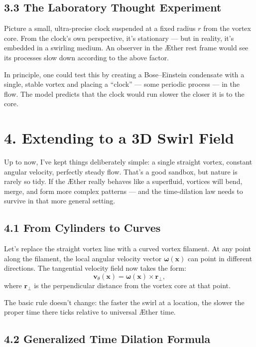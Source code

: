 \documentclass[11pt]{article}
\begin{document}
\subsection*{3.3 The Laboratory Thought Experiment}

Picture a small, ultra-precise clock suspended at a fixed radius $r$ from the vortex core. From the clock’s own perspective, it’s stationary — but in reality, it’s embedded in a swirling medium. An observer in the Æther rest frame would see its processes slow down according to the above factor.

In principle, one could test this by creating a Bose–Einstein condensate with a single, stable vortex and placing a “clock” — some periodic process — in the flow. The model predicts that the clock would run slower the closer it is to the core.

\section*{4. Extending to a 3D Swirl Field}

Up to now, I’ve kept things deliberately simple: a single straight vortex, constant angular velocity, perfectly steady flow. That’s a good sandbox, but nature is rarely so tidy. If the Æther really behaves like a superfluid, vortices will bend, merge, and form more complex patterns — and the time-dilation law needs to survive in that more general setting.

\subsection*{4.1 From Cylinders to Curves}

Let’s replace the straight vortex line with a curved vortex filament. At any point along the filament, the local angular velocity vector $\boldsymbol{\omega}(\mathbf{x})$ can point in different directions. The tangential velocity field now takes the form:
\[
\mathbf{v}_\theta(\mathbf{x}) = \boldsymbol{\omega}(\mathbf{x}) \times \mathbf{r}_\perp,
\]
where $\mathbf{r}_\perp$ is the perpendicular distance from the vortex core at that point.

The basic rule doesn’t change: the faster the swirl at a location, the slower the proper time there ticks relative to universal Æther time.

\subsection*{4.2 Generalized Time Dilation Formula}
\end{document}
